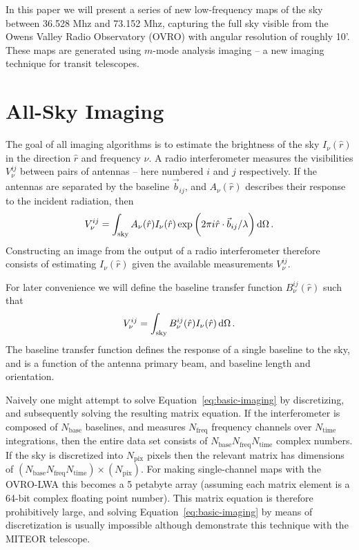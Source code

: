 \documentclass[twocolumn]{aastex61}
\renewcommand{\d}{{\rm d}}
\begin{document}
In this paper we will present a series of new low-frequency maps of the sky between 36.528 Mhz and
73.152 Mhz, capturing the full sky visible from the Owens Valley Radio Observatory (OVRO) with
angular resolution of roughly 10'. These maps are generated using $m$-mode analysis imaging -- a new
imaging technique for transit telescopes.

\section{All-Sky Imaging}

The goal of all imaging algorithms is to estimate the brightness of the sky $I_\nu(\hat r)$ in the
direction $\hat r$ and frequency $\nu$. A radio interferometer measures the visibilities
$V^{ij}_{\nu}$ between pairs of antennas -- here numbered $i$ and $j$ respectively. If the antennas
are separated by the baseline $\vec b_{ij}$, and $A_\nu(\hat r)$ describes their response to the
incident radiation, then
\begin{equation}\label{eq:basic-imaging}
    V^{ij}_\nu = \int_\text{sky}
                 A_\nu(\hat r) I_\nu(\hat r)
                 \exp\bigg(2\pi i \hat r\cdot\vec b_{ij}/\lambda\bigg) \,\d\Omega \, .
\end{equation}
Constructing an image from the output of a radio interferometer therefore consists of estimating
$I_\nu(\hat r)$ given the available measurements $V^{ij}_\nu$.

For later convenience we will define the baseline transfer function $B^{ij}_\nu(\hat r)$ such that
\begin{equation}\label{eq:baseline-transfer-function}
    V^{ij}_\nu = \int_\text{sky} B^{ij}_\nu(\hat r) I_\nu(\hat r) \,\d\Omega \, .
\end{equation}
The baseline transfer function defines the response of a single baseline to the sky, and is a
function of the antenna primary beam, and baseline length and orientation.

Naively one might attempt to solve Equation~\ref{eq:basic-imaging} by discretizing, and subsequently
solving the resulting matrix equation. If the interferometer is composed of $N_\text{base}$
baselines, and measures $N_\text{freq}$ frequency channels over $N_\text{time}$ integrations, then
the entire data set consists of $N_\text{base}N_\text{freq}N_\text{time}$ complex numbers. If the
sky is discretized into $N_\text{pix}$ pixels then the relevant matrix has dimensions of
$(N_\text{base}N_\text{freq}N_\text{time})\times(N_\text{pix})$. For making single-channel maps with
the OVRO-LWA this becomes a 5 petabyte array (assuming each matrix element is a 64-bit complex
floating point number).  This matrix equation is therefore prohibitively large, and solving
Equation~\ref{eq:basic-imaging} by means of discretization is usually impossible although
\citet{2017MNRAS.465.2901Z} demonstrate this technique with the MITEOR telescope.
\end{document}
